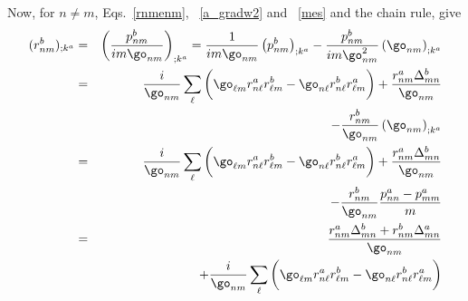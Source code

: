 Now, for $n \ne m$, Eqs.~\eqref{rnmenm},
~\eqref{a_gradw2} and 
~\eqref{mes} and the chain rule, give
\begin{eqnarray}\label{a_rgendevn}
(r^b_{nm})_{;k^a}&=&\left(\frac{p^b_{nm}}{im\go_{nm}}\right)_{;k^a}
=
\frac{1}
{im\go_{nm}}
\left(
p^b_{nm}
\right)_{;k^a}
-
\frac{p^b_{nm}}
{im\go^2_{nm}}
\left(
\go_{nm}
\right)_{;k^a}
\nonumber \\
&=&
\frac{i}{\go_{nm}}
\sum_{\ell}
\bigg(
\go_{\ell m}
r^a_{n\ell}
r^b_{\ell m}
-
\go_{n\ell}
r^b_{n\ell}
r^a_{\ell m}
\bigg)
+
\frac{r^a_{nm}
\Delta^b_{mn}}
{\go_{nm}}
\nonumber \\
&&
-
\frac{r^b_{nm}}
{\go_{nm}}
\left(
\go_{nm}
\right)_{;k^a}
\nonumber \\
&=&
\frac{i}{\go_{nm}}
\sum_{\ell}
\bigg(
\go_{\ell m}
r^a_{n\ell}
r^b_{\ell m}
-
\go_{n\ell}
r^b_{n\ell}
r^a_{\ell m}
\bigg)
+
\frac{r^a_{nm}
\Delta^b_{mn}}
{\go_{nm}}
\nonumber \\
&&
-
\frac{r^b_{nm}}
{\go_{nm}}
\frac{p^a_{nn}-p^a_{mm}}{m}
\nonumber \\
&=&
\frac{
r^a_{nm}
\Delta^b_{mn}
+r^b_{nm}
\Delta^a_{mn}
}
{\go_{nm}}
\nonumber \\
&&+
\frac{i}{\go_{nm}}
\sum_{\ell}
\bigg(
\go_{\ell m}
r^a_{n\ell}
r^b_{\ell m}
-
\go_{n\ell}
r^b_{n\ell}
r^a_{\ell m}
\bigg)
\end{eqnarray}
